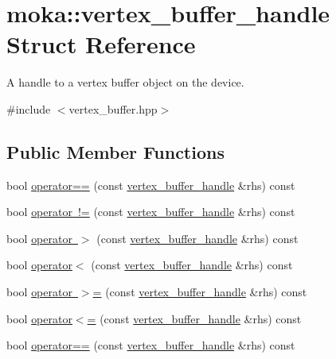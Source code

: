 \hypertarget{structmoka_1_1vertex__buffer__handle}{}\section{moka\+::vertex\+\_\+buffer\+\_\+handle Struct Reference}
\label{structmoka_1_1vertex__buffer__handle}


A handle to a vertex buffer object on the device.  




{\ttfamily \#include $<$vertex\+\_\+buffer.\+hpp$>$}

\subsection*{Public Member Functions}
\begin{DoxyCompactItemize}
\item 
bool \mbox{\hyperlink{structmoka_1_1vertex__buffer__handle_ad445e3612890e0c7a09ea8f3276f8ce3}{operator==}} (const \mbox{\hyperlink{structmoka_1_1vertex__buffer__handle}{vertex\+\_\+buffer\+\_\+handle}} \&rhs) const
\item 
bool \mbox{\hyperlink{structmoka_1_1vertex__buffer__handle_ae37df1442dde2a0b71e4e67d361bbad9}{operator !=}} (const \mbox{\hyperlink{structmoka_1_1vertex__buffer__handle}{vertex\+\_\+buffer\+\_\+handle}} \&rhs) const
\item 
bool \mbox{\hyperlink{structmoka_1_1vertex__buffer__handle_a307505fd7607a4cd1adf5ba29e7b3761}{operator $>$}} (const \mbox{\hyperlink{structmoka_1_1vertex__buffer__handle}{vertex\+\_\+buffer\+\_\+handle}} \&rhs) const
\item 
bool \mbox{\hyperlink{structmoka_1_1vertex__buffer__handle_ae68b95f114abecd5e9c15fd334fa8fe1}{operator$<$}} (const \mbox{\hyperlink{structmoka_1_1vertex__buffer__handle}{vertex\+\_\+buffer\+\_\+handle}} \&rhs) const
\item 
bool \mbox{\hyperlink{structmoka_1_1vertex__buffer__handle_aee82c7fa26d06e56fd204b0ad57bccb6}{operator $>$=}} (const \mbox{\hyperlink{structmoka_1_1vertex__buffer__handle}{vertex\+\_\+buffer\+\_\+handle}} \&rhs) const
\item 
bool \mbox{\hyperlink{structmoka_1_1vertex__buffer__handle_ad3f3043c57891760b8ec93678944e4c1}{operator$<$=}} (const \mbox{\hyperlink{structmoka_1_1vertex__buffer__handle}{vertex\+\_\+buffer\+\_\+handle}} \&rhs) const
\item 
bool \mbox{\hyperlink{structmoka_1_1vertex__buffer__handle_ad445e3612890e0c7a09ea8f3276f8ce3}{operator==}} (const \mbox{\hyperlink{structmoka_1_1vertex__buffer__handle}{vertex\+\_\+buffer\+\_\+handle}} \&rhs) const

\end{DoxyCompactItemize}
